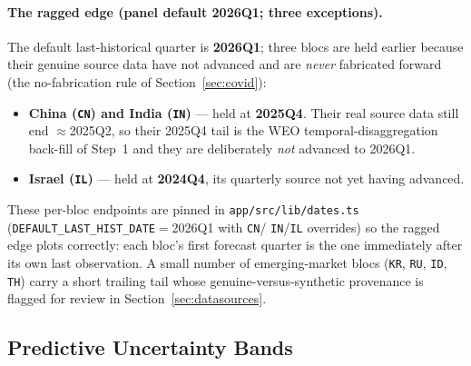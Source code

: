 \documentclass[11pt]{article}
\theoremstyle{definition}
\theoremstyle{remark}
\begin{document}
\paragraph{The ragged edge (panel default 2026Q1; three exceptions).}
The default last-historical quarter is \textbf{2026Q1}; three blocs are
held earlier because their genuine source data have not advanced and are
\emph{never} fabricated forward (the no-fabrication rule of
Section~\ref{sec:covid}):
\begin{itemize}
  \item \textbf{China (\texttt{CN}) and India (\texttt{IN})} --- held at
    \textbf{2025Q4}. Their real source data still end $\approx$2025Q2, so
    their 2025Q4 tail is the WEO temporal-disaggregation back-fill of
    Step~1 and they are deliberately \emph{not} advanced to 2026Q1.
  \item \textbf{Israel (\texttt{IL})} --- held at \textbf{2024Q4}, its
    quarterly source not yet having advanced.
\end{itemize}
These per-bloc endpoints are pinned in \texttt{app/src/lib/dates.ts}
(\texttt{DEFAULT\_LAST\_HIST\_DATE}${}={}$2026Q1 with \texttt{CN}/%
\texttt{IN}/\texttt{IL} overrides) so the ragged edge plots correctly:
each bloc's first forecast quarter is the one immediately after its own
last observation. A small number of emerging-market blocs
(\texttt{KR}, \texttt{RU}, \texttt{ID}, \texttt{TH}) carry a short trailing
tail whose genuine-versus-synthetic provenance is flagged for review in
Section~\ref{sec:datasources}.

\subsection{Predictive Uncertainty Bands}\label{sec:bands}
\end{document}
